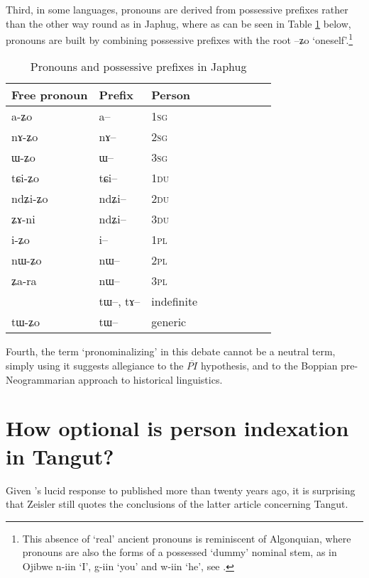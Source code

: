 \documentclass[oldfontcommands,oneside,a4paper,11pt]{article}
\newcommand{\ipa}[1]{{\phon \mbox{#1}}} %
\begin{document}
Third, in some languages, pronouns are derived from possessive prefixes rather than the other way round as in Japhug, where as can be seen in Table \ref{tab:pronoun} below, pronouns are built by combining possessive prefixes with the root \ipa{--ʑo} `oneself'.\footnote{This absence of `real' ancient pronouns is reminiscent of Algonquian, where pronouns are also the forms of a possessed `dummy' nominal stem, as in Ojibwe \ipa{n-iin} `I', \ipa{g-iin} `you' and \ipa{w-iin} `he', see \citet{valentine01grammar}. }

 \begin{table}[H] \centering
\caption{Pronouns and possessive prefixes in Japhug}\label{tab:pronoun}
\begin{tabular}{lllllllll} 
\toprule
 Free pronoun & Prefix & Person\\
\midrule
 \ipa{a-ʑo}  &	\ipa{a--}  &		1\textsc{sg} \\
\ipa{nɤ-ʑo}  &	\ipa{nɤ--}  &			2\textsc{sg}\\
\ipa{ɯ-ʑo}  &	\ipa{ɯ--}  &			3\textsc{sg}\\
\midrule
\ipa{tɕi-ʑo}  &	\ipa{tɕi--}  &			1\textsc{du} \\
\ipa{ndʑi-ʑo}  &	\ipa{ndʑi--}  &		2\textsc{du} \\	
\ipa{ʑɤ-ni}  &	\ipa{ndʑi--}  &		3\textsc{du} \\	
\midrule
\ipa{i-ʑo}    &	\ipa{i--}  &			1\textsc{pl} \\
\ipa{nɯ-ʑo}   &	\ipa{nɯ--}  &			2\textsc{pl} \\
\ipa{ʑa-ra}  &	\ipa{nɯ--}  &			3\textsc{pl} \\
\midrule
&  \ipa{tɯ--},  \ipa{tɤ--} & indefinite \\
\ipa{tɯ-ʑo} & \ipa{tɯ--}   &  generic\\
\bottomrule
\end{tabular}
\end{table}


Fourth, the term `pronominalizing' in this debate cannot be a neutral term, simply using it suggests allegiance to the  $\overline{PI}$ hypothesis, and to the Boppian pre-Neogrammarian approach to historical linguistics.

 

\section{How optional is person indexation in Tangut?}
Given \citet{kepping94conjugation}'s lucid response to \citet{lapolla92} published more than twenty years ago, it is surprising that Zeisler still quotes the conclusions of the latter article concerning Tangut.
\end{document}
